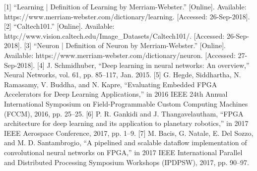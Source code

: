 \documentclass[conference]{IEEEtran}
\begin{document}
\begin{thebibliography}{00}
 [1] “Learning | Definition of Learning by Merriam-Webster.” [Online]. Available: https://www.merriam-webster.com/dictionary/learning. [Accessed: 26-Sep-2018].
 [2] “Caltech101.” [Online]. Available: http://www.vision.caltech.edu/Image\_Datasets/Caltech101/. [Accessed: 26-Sep-2018].
 [3] “Neuron | Definition of Neuron by Merriam-Webster.” [Online]. Available: https://www.merriam-webster.com/dictionary/neuron. [Accessed: 27-Sep-2018].
 [4] J. Schmidhuber, “Deep learning in neural networks: An overview,” Neural Networks, vol. 61, pp. 85–117, Jan. 2015.
 [5] G. Hegde, Siddhartha, N. Ramasamy, V. Buddha, and N. Kapre, “Evaluating Embedded FPGA Accelerators for Deep Learning Applications,” in 2016 IEEE 24th Annual International Symposium on Field-Programmable Custom Computing Machines (FCCM), 2016, pp. 25–25.
 [6] P. R. Gankidi and J. Thangavelautham, “FPGA architecture for deep learning and its application to planetary robotics,” in 2017 IEEE Aerospace Conference, 2017, pp. 1–9.
 [7] M. Bacis, G. Natale, E. Del Sozzo, and M. D. Santambrogio, “A pipelined and scalable dataflow implementation of convolutional neural networks on FPGA,” in 2017 IEEE International Parallel and Distributed Processing Symposium Workshops (IPDPSW), 2017, pp. 90–97.
\end{thebibliography}
\end{document}
